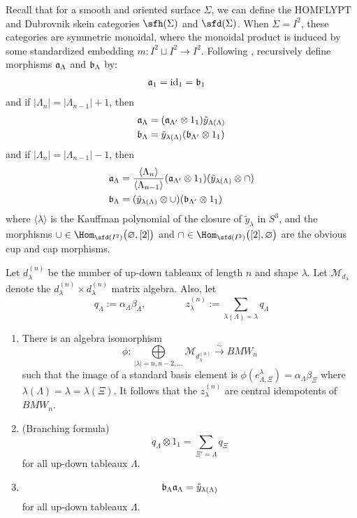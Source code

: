Recall that for a smooth and oriented surface $\Sigma$, we can define the HOMFLYPT and Dubrovnik skein categories $\sfh(\Sigma)$ and $\sfd(\Sigma)$. When $\Sigma=I^2$, these categories are symmetric monoidal, where the monoidal product is induced by some standardized embedding $m: I^2 \sqcup I^2 \to I^2$. Following , recursively define morphisms $\mathfrak{a}_\Lambda$ and $\mathfrak{b}_\Lambda$ by:
\begin{align*}
    \mathfrak{a}_1 &= {\rm{id}}_1 = \mathfrak{b}_1 
\end{align*}
and if $|\Lambda_n| = |\Lambda_{n-1}| + 1$, then 
\begin{align*}
    \mathfrak{a}_\Lambda &= (\mathfrak{a}_{\Lambda'} \otimes 1_1) \tilde{y}_{\Lambda(\Lambda)} \\
    \mathfrak{b}_\Lambda &= \tilde{y}_{\lambda(\Lambda)} (\mathfrak{b}_{\Lambda'} \otimes 1_1)
\end{align*}
and if $|\Lambda_n| = |\Lambda_{n-1}| - 1$, then
\begin{align*}
    \mathfrak{a}_\Lambda &= \frac{ \langle \Lambda_n \rangle}{ \langle \Lambda_{n-1} \rangle} (\mathfrak{a}_{\Lambda'} \otimes 1_1) (\tilde{y}_{\lambda(\Lambda)} \otimes \cap) \\
    \mathfrak{b}_\Lambda &= (\tilde{y}_{\lambda(\Lambda)} \otimes \cup) (\mathfrak{b}_{\Lambda'} \otimes 1_1)
\end{align*}
where $\langle \lambda \rangle$ is the Kauffman polynomial of the closure of $\tilde{y}_\lambda$ in $S^3$, and the morphisms $\cup \in \Hom_{\sfd(I^2)} \big( \varnothing, [2] \big)$ and $\cap \in \Hom_{\sfd(I^2)} \big( [2], \varnothing \big)$ are the obvious cup and cap morphisms.

\begin{theorem}[\AP{BB01}, Section 5] \label{thm:bmwbasis}
Let $d_\lambda^{(n)}$ be the number of up-down tableaux of length $n$ and shape $\lambda$. 
Let $\mathcal{M}_{d_\lambda}$ denote the $d_\lambda^{(n)} \times d_\lambda^{(n)}$ matrix algebra. 
Also, let
\[
    q_\Lambda := \alpha_\Lambda \beta_\Lambda, \qquad \qquad z_\lambda^{(n)}:= \sum_{\lambda(\Lambda)=\lambda} q_\Lambda
\]

\begin{enumerate} 
\item There is an algebra isomorphism
\[
    \phi: \underset{|\lambda| = n, n-2, \dots}{\bigoplus} \mathcal{M}_{d_{\lambda}^{(n)}} \overset{\sim}{\longrightarrow} BMW_n
\]
such that the image of a standard basis element is $\phi( e_{\Lambda,\Xi}^\lambda) = \alpha_\Lambda \beta_\Xi$ where $\lambda(\Lambda) = \lambda = \lambda(\Xi)$.
It follows that the $z_\lambda^{(n)}$ are central idempotents of $BMW_n$. \\
\item (Branching formula)
\[
    q_\Lambda \otimes 1_1 = \sum_{\Xi'=\Lambda} q_\Xi
\] 
for all up-down tableaux $\Lambda$.
\item 
\[
    \mathfrak{b}_\Lambda \mathfrak{a}_\Lambda = \tilde{y}_{\lambda(\Lambda)}
\]
for all up-down tableaux $\Lambda$.
\end{enumerate}
\end{theorem}


